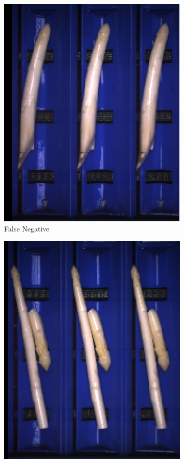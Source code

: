 \begin{figure}[h]
	\centering
	\begin{subfigure}{0.3\textwidth}
		\includegraphics[width=0.9\linewidth]{Figures/appendix/notclassifiable_falsenegative_01.png}
		\vspace{-5pt}
		\caption{False Negative}
	\end{subfigure}
	\begin{subfigure}{0.3\textwidth}
		\includegraphics[width=0.9\linewidth]{Figures/appendix/notclassifiable_falsenegative_02.png}

\end{subfigure}
\end{figure}
